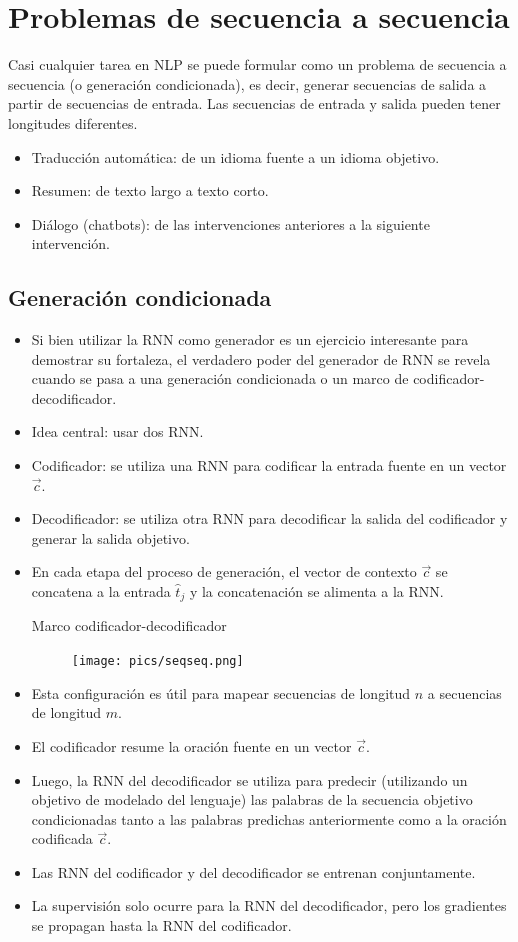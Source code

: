 \documentclass{book}
\begin{document}
\section{Problemas de secuencia a secuencia}
Casi cualquier tarea en NLP se puede formular como un problema de secuencia a secuencia (o generación condicionada), es decir, generar secuencias de salida a partir de secuencias de entrada. Las secuencias de entrada y salida pueden tener longitudes diferentes.
\begin{itemize}
\item Traducción automática: de un idioma fuente a un idioma objetivo.
\item Resumen: de texto largo a texto corto.
\item Diálogo (chatbots): de las intervenciones anteriores a la siguiente intervención.
\end{itemize}

\subsection{Generación condicionada}
\begin{itemize}
\item Si bien utilizar la RNN como generador es un ejercicio interesante para demostrar su fortaleza, el verdadero poder del generador de RNN se revela cuando se pasa a una generación condicionada o un marco de codificador-decodificador.
\item Idea central: usar dos RNN.
\item Codificador: se utiliza una RNN para codificar la entrada fuente en un vector $\overrightarrow{c}$.
\item Decodificador: se utiliza otra RNN para decodificar la salida del codificador y generar la salida objetivo.
\item En cada etapa del proceso de generación, el vector de contexto $\overrightarrow{c}$ se concatena a la entrada $\hat{t}_j$ y la concatenación se alimenta a la RNN.
\begin{frame}{Marco codificador-decodificador}
         \begin{figure}[h]
        	\texttt{[image: pics/seqseq.png]}
        \end{figure}
\end{frame}
\item Esta configuración es útil para mapear secuencias de longitud $n$ a secuencias de longitud $m$.
\item El codificador resume la oración fuente en un vector $\vec{c}$.
\item Luego, la RNN del decodificador se utiliza para predecir (utilizando un objetivo de modelado del lenguaje) las palabras de la secuencia objetivo condicionadas tanto a las palabras predichas anteriormente como a la oración codificada $\vec{c}$.
\item Las RNN del codificador y del decodificador se entrenan conjuntamente.
\item La supervisión solo ocurre para la RNN del decodificador, pero los gradientes se propagan hasta la RNN del codificador.
\end{itemize}
\end{document}
